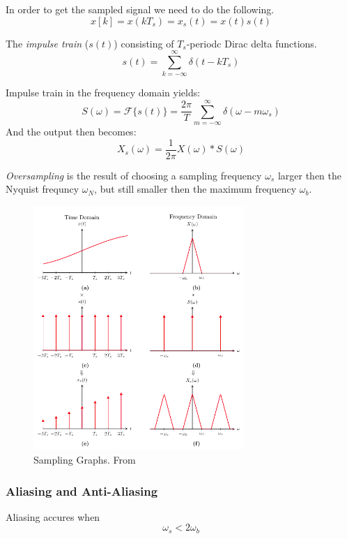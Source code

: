 \begin{multicols}{2}
In order to get the sampled signal we need to do the following.
\begin{equation*}
    x[k]=x(kT_s)=x_s(t)=x(t)s(t)
\end{equation*}

The \textit{impulse train} ($s(t)$) consisting of $T_s$-periodc Dirac delta functions.
\begin{equation*}
    s(t) = \sum_{k=-\infty}^{\infty} \delta(t-kT_s)
\end{equation*}

Impulse train in the frequency domain yields:
\begin{equation*}
    S(\omega) = \mathcal{F}\{s(t)\} = \frac{2\pi}{T} \sum_{m=-\infty}^{\infty} \delta(\omega-m\omega_s)
\end{equation*}
And the output then becomes:
\begin{equation*}
    X_s(\omega) = \frac{1}{2\pi}X(\omega) * S(\omega)
\end{equation*}

\textit{Oversampling} is the result of choosing a sampling frequency $\omega_s$ larger then the Nyquist frequncy $\omega_N$,
but still smaller then the maximum frequency $\omega_b$.

\begin{figure}[H]
   \centering
   \includegraphics[width=8cm]{image/sampling_graphs.png} 
   \caption{Sampling Graphs. From \cite{st}}
   \label{fig:sampling_graphs}
\end{figure}


\subsubsection{Aliasing and Anti-Aliasing}
Aliasing accures when 
\begin{equation*}
    \omega_s < 2\omega_b
\end{equation*}


\end{multicols}
